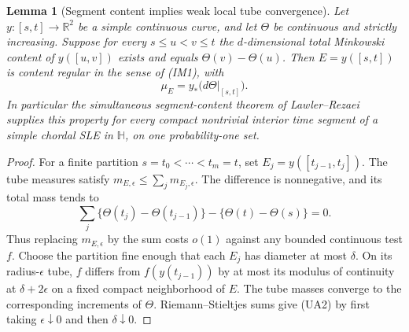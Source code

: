 \documentclass[11pt]{article}
\newtheorem{lemma}[theorem]{Lemma}
\theoremstyle{definition}\newtheorem{definition}[theorem]{Definition}
\theoremstyle{remark}\newtheorem{remark}[theorem]{Remark}
\begin{document}
\begin{lemma}[Segment content implies weak local tube convergence]
\label{lem:segment-content-weak}
Let $y:[s,t]\to\mathbb R^2$ be a simple continuous curve, and let
$\Theta$ be continuous and strictly increasing. Suppose for every
$s\le u<v\le t$ the $d$-dimensional total Minkowski content of
$y([u,v])$ exists and equals $\Theta(v)-\Theta(u)$.
Then $E=y([s,t])$ is content regular in the sense of (IM1), with
\[
 \mu_E=y_*\bigl(d\Theta|_{[s,t]}\bigr).
 \tag{UA2}
\]
In particular the simultaneous segment-content theorem of
Lawler--Rezaei~\cite[Theorem 1.1]{lawler-rezaei-content} supplies this
property for every compact nontrivial interior time segment of a
simple chordal SLE in $\mathbb H$, on one probability-one set.
\end{lemma}
\begin{proof}
For a finite partition $s=t_0<\cdots<t_m=t$, set
$E_j=y([t_{j-1},t_j])$. The tube measures satisfy
$m_{E,\epsilon}\le\sum_jm_{E_j,\epsilon}$. The difference is
nonnegative, and its total mass tends to
\[
 \sum_j\{\Theta(t_j)-\Theta(t_{j-1})\}
                     -\{\Theta(t)-\Theta(s)\}=0.
\]
Thus replacing $m_{E,\epsilon}$ by the sum costs $o(1)$ against
any bounded continuous test $f$. Choose the partition fine enough
that each $E_j$ has diameter at most $\delta$. On its radius-$\epsilon$
tube, $f$ differs from $f(y(t_{j-1}))$ by at most its modulus of
continuity at $\delta+2\epsilon$ on a fixed compact neighborhood
of $E$. The tube masses converge to the corresponding increments
of $\Theta$. Riemann--Stieltjes sums give (UA2) by first taking
$\epsilon\downarrow0$ and then $\delta\downarrow0$.
\end{proof}
\end{document}
